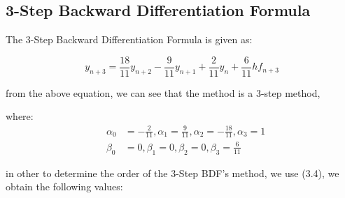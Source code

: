 \subsection{3-Step Backward Differentiation Formula}

The 3-Step Backward Differentiation Formula is given as:

\[y_{n+3} = \frac{18}{11} y_{n+2} - \frac{9}{11} y_{n+1} + \frac{2}{11} y_n + \frac{6}{11} h f_{n+3}\]


from the above equation, we can see that the method is a 3-step method,


where:
\[
\begin{aligned}&\alpha_0 &= -\frac{2}{11}, \alpha_1 = \frac{9}{11}, \alpha_2 = -\frac{18}{11}, \alpha_3 = 1 \\
&\beta_0 &= 0, \beta_1 = 0, \beta_2 = 0, \beta_3 = \frac{6}{11}
\end{aligned}
\]

in other to determine the order of the 3-Step BDF's method, we use (3.4), we obtain the following values:

